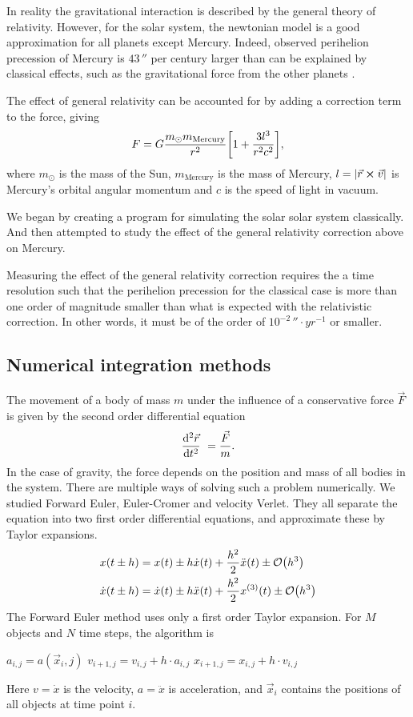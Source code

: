 \documentclass[a4paper,10pt,twocolumn]{article}
\newcommand{\un}[1]{\,\si{#1}}		%
\begin{document}
In reality the gravitational interaction is described by the general theory of relativity. However, for the solar system, the newtonian model is a good approximation for all planets except Mercury. Indeed, observed perihelion precession of Mercury is $43\un{\arcsecond}$ per century larger than can be explained by classical effects, such as the gravitational force from the other planets \cite{labtext}.

The effect of general relativity can be accounted for by adding a correction term to the force, giving \cite{labtext}
\[
F = G\frac{m_\odot m_\text{Mercury}}{r^2}\qty[1 + \frac{3l^3}{r^2c^2}],
\]
where $m_\odot$ is the mass of the Sun, $m_\text{Mercury}$ is the mass of Mercury, $l = \abs{\vec{r}\cross\vec{v}}$ is Mercury's orbital angular momentum and $c$ is the speed of light in vacuum.

We began by creating a program for simulating the solar solar system classically. 
And then attempted to study the effect of the general relativity correction above on Mercury.

Measuring the effect of the general relativity correction requires the a time resolution such that the perihelion precession for the classical case is more than one order of magnitude smaller than what is expected with the relativistic correction. In other words, it must be of the order of $10^{-2}\un{\arcsecond\cdot yr^{-1}}$ or smaller.


\subsection*{Numerical integration methods}
The movement of a body of mass $m$ under the influence of a conservative force $\vec{F}$ is given by the second order differential equation
\[
\dv[2]{\vec{r}}{t} = \frac{\vec{F}}{m}.
\] 
In the case of gravity, the force depends on the position and mass of all bodies in the system. There are multiple ways of solving such a problem numerically. We studied Forward Euler, Euler-Cromer and velocity Verlet. They all separate the equation into two first order differential equations, and approximate these by Taylor expansions. 
\begin{align*}
x(t\pm h) &= x(t) \pm h\dot{x}(t) + \frac{h^2}{2}\ddot{x}(t) \pm \order{h^3} \\
\dot{x}(t\pm h) &= \dot{x}(t) \pm h\ddot{x}(t)  + \frac{h^2}{2}x^{(3)}(t) \pm \order{h^3}
\end{align*}
The Forward Euler method uses only a first order Taylor expansion. 
For $M$ objects and $N$ time steps, the algorithm is
\begin{algorithmic}
\State $a_{i,j} = a(\vec{x}_i,j)$
\State $v_{i+1,j} = v_{i,j} + h\cdot a_{i,j}$
\State $x_{i+1,j} = x_{i,j} + h\cdot v_{i,j}$
\EndFor
\EndFor
\end{algorithmic}
Here $v=\dot{x}$ is the velocity, $a=\ddot{x}$ is acceleration, and $\vec{x}_i$ contains the positions of all objects at time point $i$. 
\end{document}
